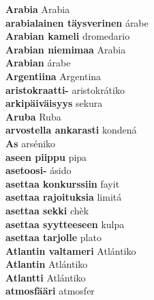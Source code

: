 \textbf{ Arabia  } Arabia \\
\textbf{ arabialainen täysverinen  } árabe \\
\textbf{ Arabian kameli  } dromedario \\
\textbf{ Arabian niemimaa  } Arabia \\
\textbf{ Arabian  } árabe \\
\textbf{ Argentiina  } Argentina \\
\textbf{ aristokraatti-  } aristokrátiko \\
\textbf{ arkipäiväisyys  } sekura \\
\textbf{ Aruba  } Ruba \\
\textbf{ arvostella ankarasti  } kondená \\
\textbf{ As  } arséniko \\
\textbf{ aseen piippu  } pipa \\
\textbf{ asetoosi-  } ásido \\
\textbf{ asettaa konkurssiin  } fayit \\
\textbf{ asettaa rajoituksia  } limitá \\
\textbf{ asettaa sekki  } chèk \\
\textbf{ asettaa syytteeseen  } kulpa \\
\textbf{ asettaa tarjolle  } plato \\
\textbf{ Atlantin valtameri  } Atlántiko \\
\textbf{ Atlantin  } Atlántiko \\
\textbf{ Atlantti  } Atlántiko \\
\textbf{ atmosfääri  } atmosfer \\
